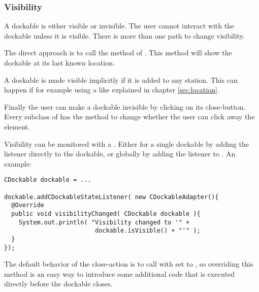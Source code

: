 

\subsubsection{Visibility}
A dockable is either visible or invisible. The user cannot interact with the dockable unless it is visible. There is more than one path to change visibility.

The direct approach is to call the method  of . This method will show the dockable at its last known location.

A dockable is made visible implicitly if it is added to any station. This can happen if for example using a  like explained in chapter \ref{sec:location}.

Finally the user can make a dockable invisible by clicking on its close-button. Every subclass of  has the method  to change whether the user can click away the element.

Visibility can be monitored with a . Either for a single dockable by adding the listener directly to the dockable, or globally by adding the listener to . An example:
\begin{lstlisting}
CDockable dockable = ...
		
dockable.addCDockableStateListener( new CDockableAdapter(){
  @Override
  public void visibilityChanged( CDockable dockable ){
    System.out.println( "Visibility changed to '" + 
                         dockable.isVisible() + "'" );
  }
});
\end{lstlisting}

 The default behavior of the close-action is to call  with  set to , so overriding this method is an easy way to introduce some additional code that is executed directly before the dockable closes.

